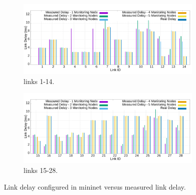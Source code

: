 \documentclass[10pt, journal, letterpaper]{IEEEtran}
\begin{document}
\begin{figure}
    \begin{subfigure}{\columnwidth}
      \centering
      \includegraphics[width=\columnwidth]{img/eval_link_delay_real_and_measured_part_14_1.png}
      \caption{links 1-14.}
      \label{fig:real_delay_abile_p1}
    \end{subfigure}
    \begin{subfigure}{\columnwidth}
      \centering
      \includegraphics[width=\columnwidth]{img/eval_link_delay_real_and_measured_part_14_2.png}
     \caption{links 15-28.}
     \label{fig:real_delay_abile_p2}
    \end{subfigure}
    \caption{Link delay configured in mininet versus measured link delay.}
    \label{fig:real_delay_abile}
\end{figure}
\end{document}
